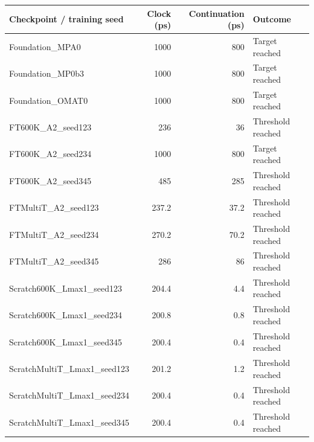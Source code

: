 \begin{tabular}{lrrl}
\toprule
Checkpoint / training seed & Clock (ps) & Continuation (ps) & Outcome \\
\midrule
Foundation\_MPA0 & 1000 & 800 & Target reached \\
Foundation\_MP0b3 & 1000 & 800 & Target reached \\
Foundation\_OMAT0 & 1000 & 800 & Target reached \\
FT600K\_A2\_seed123 & 236 & 36 & Threshold reached \\
FT600K\_A2\_seed234 & 1000 & 800 & Target reached \\
FT600K\_A2\_seed345 & 485 & 285 & Threshold reached \\
FTMultiT\_A2\_seed123 & 237.2 & 37.2 & Threshold reached \\
FTMultiT\_A2\_seed234 & 270.2 & 70.2 & Threshold reached \\
FTMultiT\_A2\_seed345 & 286 & 86 & Threshold reached \\
Scratch600K\_Lmax1\_seed123 & 204.4 & 4.4 & Threshold reached \\
Scratch600K\_Lmax1\_seed234 & 200.8 & 0.8 & Threshold reached \\
Scratch600K\_Lmax1\_seed345 & 200.4 & 0.4 & Threshold reached \\
ScratchMultiT\_Lmax1\_seed123 & 201.2 & 1.2 & Threshold reached \\
ScratchMultiT\_Lmax1\_seed234 & 200.4 & 0.4 & Threshold reached \\
ScratchMultiT\_Lmax1\_seed345 & 200.4 & 0.4 & Threshold reached \\
\bottomrule
\end{tabular}
